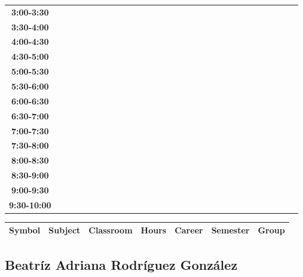 \documentclass{article}
\begin{document}
\begin{table}[ht]
\begin{tabular}{|c|c|c|c|c|c|c|c|c|c|c|c|c|c|c|c|c|c|c|c|c|c|c|c|c|c|c|c|c|c|}
\textbf{3:00-3:30} &   &   &   &   &   &   &   \\
 \cline{1-8} 
\textbf{3:30-4:00} &   &   &   &   &   &   &   \\
 \cline{1-8} 
\textbf{4:00-4:30} &   &   &   &   &   &   &   \\
 \cline{1-8} 
\textbf{4:30-5:00} &   &   &   &   &   &   &   \\
 \cline{1-8} 
\textbf{5:00-5:30} &   &   &   &   &   &   &   \\
 \cline{1-8} 
\textbf{5:30-6:00} &   &   &   &   &   &   &   \\
 \cline{1-8} 
\textbf{6:00-6:30} &   &   &   &   &   &   &   \\
 \cline{1-8} 
\textbf{6:30-7:00} &   &   &   &   &   &   &   \\
 \cline{1-8} 
\textbf{7:00-7:30} &   &   &   &   &   &   &   \\
 \cline{1-8} 
\textbf{7:30-8:00} &   &   &   &   &   &   &   \\
 \cline{1-8} 
\textbf{8:00-8:30} &   &   &   &   &   &   &   \\
 \cline{1-8} 
\textbf{8:30-9:00} &   &   &   &   &   &   &   \\
 \cline{1-8} 
\textbf{9:00-9:30} &   &   &   &   &   &   &   \\
 \cline{1-8} 
\textbf{9:30-10:00} &   &   &   &   &   &   &   \\
 \cline{1-8} 
\end{tabular}\end{table}

        
        \begin{tabular}{|>{\centering\arraybackslash}m{2cm}|>{\centering\arraybackslash}m{4cm}|>{\centering\arraybackslash}m{2cm}|>{\centering\arraybackslash}m{2cm}|>{\centering\arraybackslash}m{2cm}|>{\centering\arraybackslash}m{2cm}|>{\centering\arraybackslash}m{2cm}|}
        \hline
        \textbf{Symbol} & \textbf{Subject} & \textbf{Classroom} & \textbf{Hours} & \textbf{Career} & \textbf{Semester} & \textbf{Group} \\
        \hline
        \end{tabular}
                    

        \newpage
        

        \subsection{Beatr\'iz Adriana Rodr\'iguez Gonz\'alez}
        \vspace*{.1cm}
        
\end{document}
